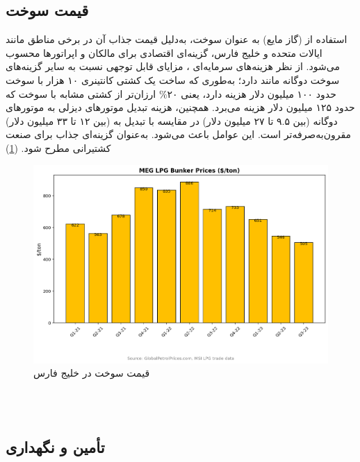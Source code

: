 \subsection{قیمت سوخت}
استفاده از
 (گاز مایع) به عنوان سوخت، به‌دلیل قیمت جذاب آن در برخی مناطق مانند ایالات متحده و خلیج فارس، گزینه‌ای اقتصادی برای مالکان و اپراتورها محسوب می‌شود. از نظر هزینه‌های سرمایه‌ای 
 ،
 مزایای قابل توجهی نسبت به سایر گزینه‌های سوخت دوگانه 
  مانند 
   دارد؛ به‌طوری که ساخت یک کشتی کانتینری ۱۰ هزار 
   با سوخت 
    حدود ۱۰۰ میلیون دلار هزینه دارد، یعنی ۲۰$\%$ ارزان‌تر از کشتی مشابه با سوخت 
    که حدود ۱۲۵ میلیون دلار هزینه می‌برد. همچنین، هزینه تبدیل موتورهای دیزلی به موتورهای دوگانه 
    (بین ۹.۵ تا ۲۷ میلیون دلار) در مقایسه با تبدیل به
     (بین ۱۲ تا ۳۳ میلیون دلار) مقرون‌به‌صرفه‌تر است. این عوامل باعث می‌شود.
      به‌عنوان گزینه‌ای جذاب برای صنعت کشتیرانی مطرح شود.
(\cref{price})
\begin{figure}[!h]
   	\centering
   		\includegraphics[width=15cm]{Figures/LPG/price.png}
   	\caption{ قیمت سوخت در خلیج فارس}\label{price}
\end{figure}
\\
\\
\subsection{تأمین و نگهداری}
